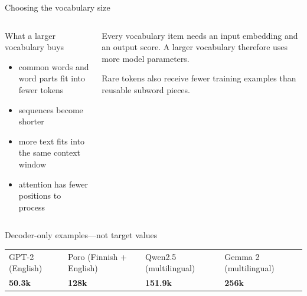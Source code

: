 \documentclass[aspectratio=169,10pt]{beamer}
\begin{document}
\begin{frame}{Choosing the vocabulary size}
  \begin{columns}[T]
    \begin{column}{0.48\textwidth}
      \begin{block}{What a larger vocabulary buys}
      \begin{itemize}
        \item common words and word parts fit into fewer tokens
        \item sequences become shorter
        \item more text fits into the same context window
        \item attention has fewer positions to process
      \end{itemize}
      \end{block}
    \end{column}
    \begin{column}{0.48\textwidth}
      \begin{gotcha}
        Every vocabulary item needs an input embedding and an output score.
        A larger vocabulary therefore uses more model parameters.
        \vspace{0.4em}

        Rare tokens also receive fewer training examples than reusable
        subword pieces.
      \end{gotcha}
    \end{column}
  \end{columns}
  \vfill
  \begin{block}{Decoder-only examples—not target values}
    \centering\small
    \begin{tabular}{@{}C{2.8cm} C{2.8cm} C{2.8cm} C{2.8cm}@{}}
      GPT-2 (English) & Poro (Finnish + English) &
      Qwen2.5 (multilingual) & Gemma 2 (multilingual)\\
      \textbf{50.3k} & \textbf{128k} & \textbf{151.9k} & \textbf{256k}
    \end{tabular}
  \end{block}
\end{frame}
\end{document}
